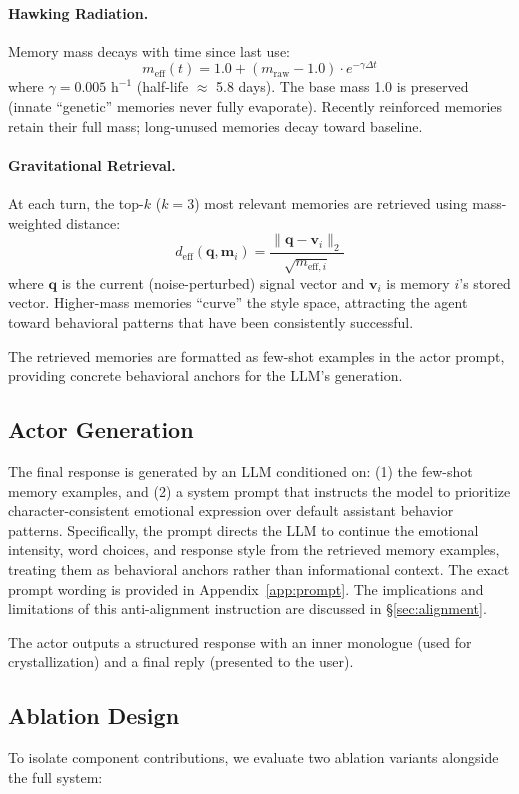 \paragraph{Hawking Radiation.} Memory mass decays with time since last use:
\begin{equation}
    m_\text{eff}(t) = 1.0 + (m_\text{raw} - 1.0) \cdot e^{-\gamma \Delta t}
\end{equation}
where $\gamma = 0.005 \text{ h}^{-1}$ (half-life $\approx$ 5.8 days). The base mass 1.0 is preserved (innate ``genetic'' memories never fully evaporate). Recently reinforced memories retain their full mass; long-unused memories decay toward baseline.

\paragraph{Gravitational Retrieval.} At each turn, the top-$k$ ($k=3$) most relevant memories are retrieved using mass-weighted distance:
\begin{equation}
    d_\text{eff}(\mathbf{q}, \mathbf{m}_i) = \frac{\|\mathbf{q} - \mathbf{v}_i\|_2}{\sqrt{m_{\text{eff},i}}}
\end{equation}
where $\mathbf{q}$ is the current (noise-perturbed) signal vector and $\mathbf{v}_i$ is memory $i$'s stored vector. Higher-mass memories ``curve'' the style space, attracting the agent toward behavioral patterns that have been consistently successful.

The retrieved memories are formatted as few-shot examples in the actor prompt, providing concrete behavioral anchors for the LLM's generation.

\subsection{Actor Generation}

The final response is generated by an LLM conditioned on: (1) the few-shot memory examples, and (2) a system prompt that instructs the model to prioritize character-consistent emotional expression over default assistant behavior patterns. Specifically, the prompt directs the LLM to continue the emotional intensity, word choices, and response style from the retrieved memory examples, treating them as behavioral anchors rather than informational context. The exact prompt wording is provided in Appendix~\ref{app:prompt}. The implications and limitations of this anti-alignment instruction are discussed in \S\ref{sec:alignment}.

The actor outputs a structured response with an inner monologue (used for crystallization) and a final reply (presented to the user).

\subsection{Ablation Design}

To isolate component contributions, we evaluate two ablation variants alongside the full system:


